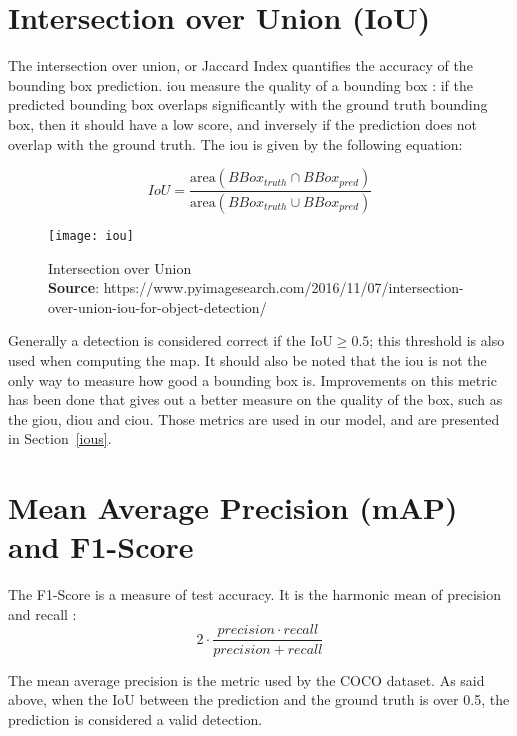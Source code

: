 \section{Intersection over Union (IoU)}\label{iouExplanation}
The intersection over union, or Jaccard Index quantifies the accuracy of the bounding box prediction. \gls{iou} measure the quality of a bounding box : if the predicted bounding box overlaps significantly with the ground truth bounding box, then it should have a low score, and inversely if the prediction does not overlap with the ground truth. The \gls{iou} is given by the following equation:

\begin{equation}
	IoU = \frac{\text{area}(BBox_{truth} \cap BBox_{pred})} {\text{area}(BBox_{truth} \cup BBox_{pred})}
\end{equation}

\begin{figure}
  \centering
  \texttt{[image: iou]}
	\caption[Intersection over Union]{Intersection over Union\\\textbf{Source}: https://www.pyimagesearch.com/2016/11/07/intersection-over-union-iou-for-object-detection/}
  \label{fig:iou}
\end{figure}

Generally a detection is considered correct if the $\text{IoU} \geq 0.5$; this threshold is also used when computing the \gls{map}. It should also be noted that the \gls{iou} is not the only way to measure how good a bounding box is. Improvements on this metric has been done that gives out a better measure on the quality of the box, such as the \gls{giou}\cite{giou}, \gls{diou}\cite{diou} and \gls{ciou}\cite{diou}. Those metrics are used in our model, and are presented in Section~\ref{ious}. 

\section{Mean Average Precision (mAP) and F1-Score}
The F1-Score is a measure of test accuracy. It is the harmonic mean of precision and recall :
\begin{equation}
	2 \cdot \frac{precision \cdot recall}{precision + recall}
\end{equation}

The mean average precision is the metric used by the COCO dataset\cite{msCOCO}. As said above, when the IoU between the prediction and the ground truth is over 0.5, the prediction is considered a valid detection. 

